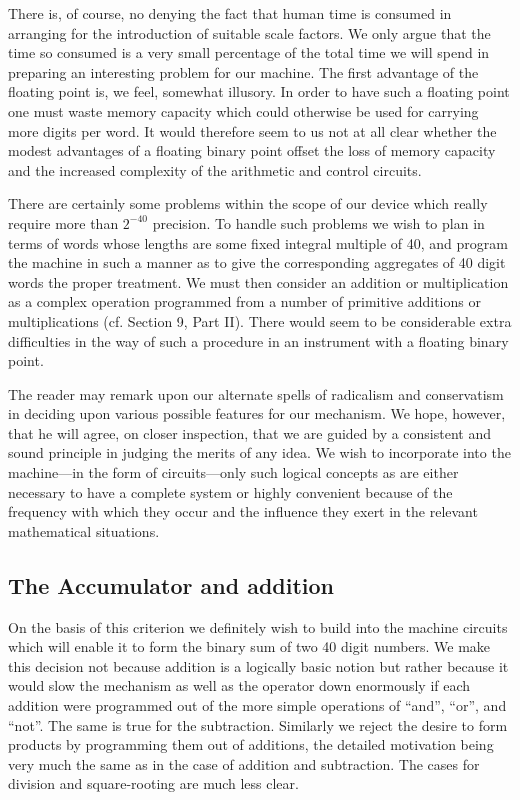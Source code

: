 \documentclass[12pt]{amsart}
\begin{document}
There is, of course, no denying the fact that human time is consumed in arranging for the introduction of suitable scale factors. We only argue that the time so consumed is a very small percentage of the total time we will spend in preparing an interesting problem for our machine. The first advantage of the floating point is, we feel, somewhat illusory. In order to have such a floating point one must waste memory capacity which could otherwise be used for carrying more digits per word. It would therefore seem to us not at all clear whether the modest advantages of a floating binary point offset the loss of memory capacity and the increased complexity of the arithmetic and control circuits.

There are certainly some problems within the scope of our device which really require more than $2^{-40}$ precision. To handle such problems we wish to plan in terms of words whose lengths are some fixed integral multiple of 40, and program the machine in such a manner as to give the corresponding aggregates of 40 digit words the proper treatment. We must then consider an addition or multiplication as a complex operation programmed from a number of primitive additions or multiplications (cf. Section 9, Part II). There would seem to be considerable extra difficulties in the way of such a procedure in an instrument with a floating binary point.

The reader may remark upon our alternate spells of radicalism and conservatism in deciding upon various possible features for our mechanism. We hope, however, that he will agree, on closer inspection, that we are guided by a consistent and sound principle in judging the merits of any idea. We wish to incorporate into the machine---in the form of circuits---only such logical concepts as are either necessary to have a complete system or highly convenient because of the frequency with which they occur and the influence they exert in the relevant mathematical situations.

\subsection{The Accumulator and addition}
On the basis of this criterion we definitely wish to build into the machine circuits which will enable it to form the binary sum of two 40 digit numbers. We make this decision not because addition is a logically basic notion but rather because it would slow the mechanism as well as the operator down enormously if each addition were programmed out of the more simple operations of ``and'', ``or'', and ``not''. The same is true for the subtraction. Similarly we reject the desire to form products by programming them out of additions, the detailed motivation being very much the same as in the case of addition and subtraction. The cases for division and square-rooting are much less clear.
\end{document}
